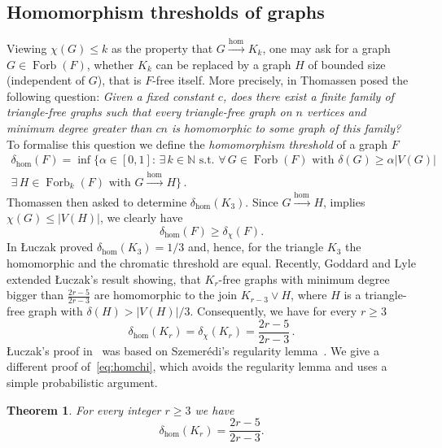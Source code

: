 \documentclass[reqno, 12pt]{amsart}
\theoremstyle{plain}
\newtheorem{thm}{Theorem}[section]
\theoremstyle{definition}
\begin{document}
\subsection{Homomorphism thresholds of graphs}
Viewing $\chi(G)\leq k$ as the property that $G{\xrightarrow{\text{hom}\,}} K_k$, one may ask
for a graph $G\in\operatorname{Forb}(F)$, whether $K_k$ can be replaced by a graph $H$ of bounded size (independent of $G$), that is 
$F$-free itself.
More precisely, in \cite{T_C02} Thomassen posed the following question: \emph{Given a fixed constant $c$, does there exist a finite family of triangle-free graphs such that every triangle-free graph on $n$ vertices and minimum degree greater than $cn$ is homomorphic to some graph of this family?}
To formalise this question we define the \emph{homomorphism threshold} of a graph $F$
\begin{multline*}									
\delta_{\hom}(F) = 
	\inf\big\{\alpha\in[0,1]{\colon\,}\exists\, k\in{\mathbb N} \text{ s.t.\ } 
		\forall\, G\in \operatorname{Forb}(F)\text{ with } \delta(G)\geq\alpha|V(G)|\\
		\exists\, H\in \operatorname{Forb}_k(F)\text{ with } G{\xrightarrow{\text{hom}\,}} H\big\}\,.
\end{multline*}				
Thomassen then asked to determine $\delta_{\hom}(K_3)$.
Since $G{\xrightarrow{\text{hom}\,}} H$, implies  $\chi(G)\leq |V(H)|$,  we clearly have
									\[\delta_{\hom}(F)\geq\delta_{\chi}(F).\]
									In \cite{L06} \L uczak proved $\delta_{\hom}(K_3)=1/3$ and, hence, 
for the  triangle $K_3$ the homomorphic and the chromatic threshold are equal.
Recently, Goddard and Lyle \cite{GL10} extended \L uczak's result
showing, that $K_r$-free graphs with minimum degree bigger than $\frac{2r-5}{2r-3}$ are homomorphic to the join
$K_{r-3} \vee H$, where $H$ is a triangle-free graph with $\delta(H)>|V(H)|/3$.
Consequently, we have for every $r\geq 3$
									\begin{equation}\label{eq:homchi}
	\delta_{\hom}(K_r)=\delta_{\chi}(K_r)=\frac{2r-5}{2r-3}\,.
\end{equation}
									\L uczak's proof in~\cite{L06} was based on Szemer\'edi's regularity lemma~\cite{Sz}.
We give a different proof of~\eqref{eq:homchi}, which avoids the regularity lemma 
and uses a simple probabilistic argument.

\begin{thm}\label{theorem:main}
	For every integer $r\geq 3$ we have
	\[\delta_{\hom}(K_r)=\frac{2r-5}{2r-3}.\]
\end{thm}
\end{document}

